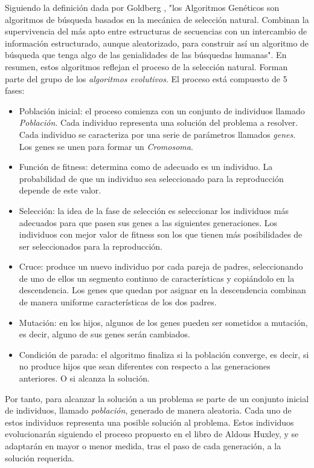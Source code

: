 Siguiendo la definición dada por Goldberg \cite{goldberg89}, "los Algoritmos Genéticos son algoritmos de búsqueda
basados en la mecánica de selección natural. Combinan la supervivencia del más apto entre estructuras de secuencias con un intercambio de 
información estructurado, aunque aleatorizado, para construir así un algoritmo de búsqueda que tenga algo de las genialidades de las 
búsquedas humanas". En resumen, estos algoritmos reflejan el proceso de la selección natural. Forman parte del grupo de los \emph{algoritmos evolutivos}. 
El proceso está compuesto de 5 fases:

\begin{itemize}
    \item Población inicial: el proceso comienza con un conjunto de individuos llamado \emph{Población}. Cada individuo
    representa una solución del problema a resolver. Cada individuo se caracteriza por una serie de parámetros llamados
    \emph{genes}. Los genes se unen para formar un \emph{Cromosoma}.
    \item Función de fitness: determina como de adecuado es un individuo. La probabilidad de que un individuo sea 
    seleccionado para la reproducción depende de este valor.
    \item Selección: la idea de la fase de selección es seleccionar los individuos más adecuados para que pasen sus
    genes a las siguientes generaciones. Los individuos con mejor valor de fitness son los que tienen más posibilidades
    de ser seleccionados para la reproducción.
    \item Cruce: produce un nuevo individuo por cada pareja de padres, seleccionando de uno de ellos un segmento
    continuo de características y copiándolo en la descendencia. Los genes que quedan por asignar en la descendencia
    combinan de manera uniforme características de los dos padres.
    \item Mutación: en los hijos, algunos de los genes pueden ser sometidos a mutación, es decir, alguno de sus genes
    serán cambiados.
    \item Condición de parada: el algoritmo finaliza si la población converge, es decir, si no produce hijos que sean 
    diferentes con respecto a las generaciones anteriores. O si alcanza la solución.
\end{itemize}

Por tanto, para alcanzar la solución a un problema se parte de un conjunto inicial de individuos, llamado \textit{población},
generado de manera aleatoria. Cada uno de estos individuos representa una posible solución al problema. Estos individuos
evolucionarán siguiendo el proceso propuesto en el libro de Aldous Huxley, y se adaptarán en mayor o menor medida,
tras el paso de cada generación, a la solución requerida.

